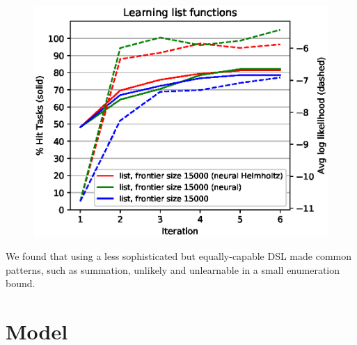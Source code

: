 \documentclass{article}
\begin{document}
\begin{figure}
  \includegraphics[width=\columnwidth]{figures/list.eps}
\end{figure}

We found that using a less sophisticated but equally-capable DSL made common
patterns, such as summation, unlikely and unlearnable in a small enumeration
bound.

\section{Model}












\end{document}
